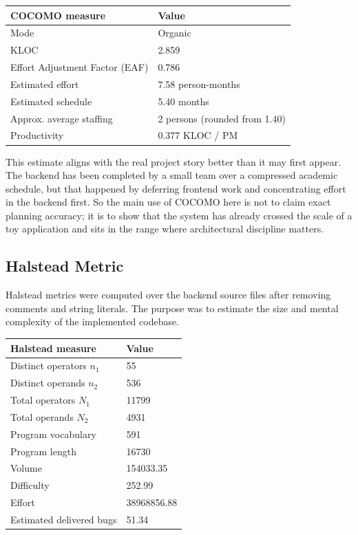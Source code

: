 \documentclass[11pt,a4paper]{article}
\begin{document}
\begin{center}
\begin{tabular}{|p{7cm}|p{4cm}|}
\hline
\rowcolor{SoftBlue}
\textbf{COCOMO measure} & \textbf{Value} \\
\hline
Mode & Organic \\
KLOC & 2.859 \\
Effort Adjustment Factor (EAF) & 0.786 \\
Estimated effort & 7.58 person-months \\
Estimated schedule & 5.40 months \\
Approx. average staffing & 2 persons (rounded from 1.40) \\
Productivity & 0.377 KLOC / PM \\
\hline
\end{tabular}
\end{center}

This estimate aligns with the real project story better than it may first appear. The backend has been completed by a small team over a compressed academic schedule, but that happened by deferring frontend work and concentrating effort in the backend first. So the main use of COCOMO here is not to claim exact planning accuracy; it is to show that the system has already crossed the scale of a toy application and sits in the range where architectural discipline matters.

\subsection{Halstead Metric}
Halstead metrics were computed over the backend source files after removing comments and string literals. The purpose was to estimate the size and mental complexity of the implemented codebase.

\begin{center}
\begin{tabular}{|p{7cm}|p{4cm}|}
\hline
\rowcolor{SoftBlue}
\textbf{Halstead measure} & \textbf{Value} \\
\hline
Distinct operators \(n_1\) & 55 \\
Distinct operands \(n_2\) & 536 \\
Total operators \(N_1\) & 11799 \\
Total operands \(N_2\) & 4931 \\
Program vocabulary & 591 \\
Program length & 16730 \\
Volume & 154033.35 \\
Difficulty & 252.99 \\
Effort & 38968856.88 \\
Estimated delivered bugs & 51.34 \\
\hline
\end{tabular}
\end{center}
\end{document}
